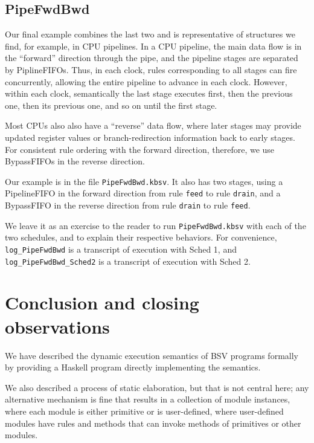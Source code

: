 \documentclass[11pt]{article}
\newcommand{\term}[1]{\texttt{#1}}
\begin{document}

\subsection{PipeFwdBwd}

Our final example combines the last two and is representative of
structures we find, for example, in CPU pipelines.  In a CPU pipeline,
the main data flow is in the ``forward'' direction through the pipe,
and the pipeline stages are separated by PiplineFIFOs.  Thus, in each
clock, rules corresponding to all stages can fire concurrently,
allowing the entire pipeline to advance in each clock.  However,
within each clock, semantically the last stage executes first, then
the previous one, then its previous one, and so on until the first
stage.

Most CPUs also also have a ``reverse'' data flow, where later stages
may provide updated register values or branch-redirection information
back to early stages.  For consistent rule ordering with the forward
direction, therefore, we use BypassFIFOs in the reverse direction.

Our example is in the file \term{PipeFwdBwd.kbsv}.  It also has two
stages, using a PipelineFIFO in the forward direction from rule
\term{feed} to rule \term{drain}, and a BypassFIFO in the reverse
direction from rule \term{drain} to rule \term{feed}.

We leave it as an exercise to the reader to run \term{PipeFwdBwd.kbsv}
with each of the two schedules, and to explain their respective
behaviors.  For convenience, \verb|log_PipeFwdBwd| is a transcript of
execution with Sched 1, and \verb|log_PipeFwdBwd_Sched2| is a
transcript of execution with Sched 2.



\section{Conclusion and closing observations}

\label{sec_conclusion}

We have described the dynamic execution semantics of BSV programs
formally by providing a Haskell program directly implementing the
semantics.

We also described a process of static elaboration, but that is not
central here; any alternative mechanism is fine that results in a
collection of module instances, where each module is either primitive
or is user-defined, where user-defined modules have rules and methods
that can invoke methods of primitives or other modules.
\end{document}
